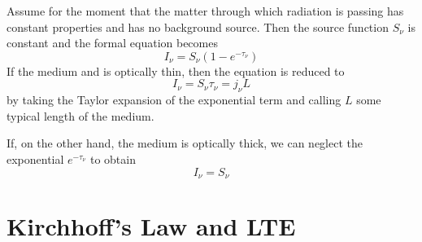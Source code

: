 Assume for the moment that the matter through which radiation is passing has constant properties and has no background source. Then the source function $S_{\nu}$ is constant and the formal equation becomes
\begin{equation*}
	I_{\nu} = S_{\nu}(1-e^{-\tau_{\nu}})
\end{equation*}
If the medium  and is optically thin, then the equation is reduced to 
\begin{equation}
	I_{\nu} = S_{\nu}\tau_{\nu} = j_{\nu}L
\end{equation}
by taking the Taylor expansion of the exponential term and calling $L$ some typical length of the medium.
\par If, on the other hand, the medium is optically thick, we can neglect the exponential $e^{-\tau_{\nu}}$ to obtain
\begin{equation}
	I_{\nu} = S_{\nu}
	\label{eq:k1}
\end{equation}

\section{Kirchhoff's Law and LTE}

